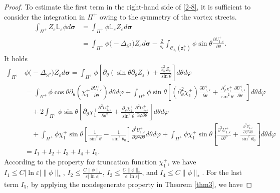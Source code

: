 \documentclass[12pt,reqno]{amsart}
\numberwithin{equation}{section}
\theoremstyle{definition}
\theoremstyle{remark}
\begin{document}
\begin{proof}
	
	To estimate the first term in the right-hand side of \eqref{2-8}, it is sufficient to consider the integration in $\Pi^+$ owing to the symmetry of the vortex streets.
	\begin{align*}
		\int_{\Pi^+}Z_\varepsilon\mathbb L_\varepsilon\phi d\boldsymbol \sigma&=\int_{\Pi^+}\phi\mathbb L_\varepsilon Z_\varepsilon d\boldsymbol \sigma\\
		&=\int_{\Pi^+}\phi\mathbb (-\Delta_{\mathbb S^2})Z_\varepsilon d\boldsymbol \sigma-\frac{2}{s_\varepsilon}\int_{\mathcal C_{s_\varepsilon}(\boldsymbol z_1^+)}\phi\sin\theta \frac{\partial U^+_{1,\varepsilon}}{\partial \theta}.
	\end{align*}
	It holds
	\begin{align*}
		\int_{\Pi^+}&\phi\mathbb (-\Delta_{\mathbb S^2})Z_\varepsilon d\boldsymbol \sigma=\int_{\Pi^+}\phi\left[\partial_\theta(\sin\theta\partial_\theta Z_\varepsilon)+\frac{\partial_\varphi^2Z_\varepsilon}{\sin\theta}\right]d\theta d\varphi\\
		&=\int_{\Pi^+}\phi\cos\theta\partial_\theta\left(\chi_1^+\frac{\partial U^+_{1,\varepsilon}}{\partial \theta}\right)d\theta d\varphi +\int_{\Pi^+}\phi\sin\theta\left[(\partial_\theta^2\chi_1^+)\frac{\partial U^+_{1,\varepsilon}}{\partial \theta}+\frac{\partial_\varphi^2\chi_1^+}{\sin^2\theta}\frac{\partial U^+_{1,\varepsilon}}{\partial \theta}\right]d\theta d\varphi\\
		&\quad+2\int_{\Pi^+}\phi\sin\theta\left[\partial_\theta\chi_1^+\frac{\partial^2 U^+_{1,\varepsilon}}{\partial \theta^2}+\frac{\partial_\varphi\chi_1^+}{\sin^2\theta} \frac{\partial^2 U^+_{1,\varepsilon}}{\partial\varphi\partial \theta}\right]d\theta d\varphi\\
		&\quad+\int_{\Pi^+}\phi\chi_1^+\sin\theta\left[\frac{1}{\sin^2\theta}-\frac{1}{\sin^2\theta_0}\right] \frac{\partial^2 U^+_{1,\varepsilon}}{\partial\varphi^2\partial \theta}d\theta d\varphi+\int_{\Pi^+}\phi\chi_1^+\sin\theta\left[\frac{\partial^3 U^+_{1,\varepsilon}}{\partial \theta^3}+\frac{\frac{\partial^3 U^+_{1,\varepsilon}}{\partial \varphi^2\partial \theta}}{\sin^2\theta_0}\right]d\theta d\varphi\\
		&=I_1+I_2+I_3+I_4+I_5.
\end{align*}
	According to the property for truncation function $\chi_1^+$, we have $I_1\le C|\ln\varepsilon|\|\phi\|_*$, $I_2\le \frac{C\|\phi\|_*}{\varepsilon|\ln\varepsilon|}$, $I_3\le \frac{C\|\phi\|_*}{\varepsilon|\ln\varepsilon|}$, and $I_4\le C\|\phi\|_*$. For the last term $I_5$, by applying the nondegenerate property in Theorem \ref{thm3}, we have

\end{proof}
\end{document}
